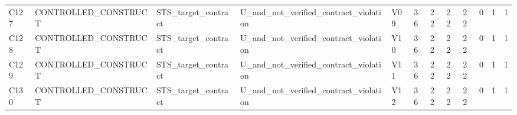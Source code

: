 \begin{longtable}{llllllllllll}
C127 & CONTROLLED\_CONSTRUCT & STS\_target\_contract & U\_and\_not\_verified\_contract\_violation & V09 & 36 & 22 & 22 & 22 & 0 & 1 & 1 \\
C128 & CONTROLLED\_CONSTRUCT & STS\_target\_contract & U\_and\_not\_verified\_contract\_violation & V10 & 36 & 22 & 22 & 22 & 0 & 1 & 1 \\
C129 & CONTROLLED\_CONSTRUCT & STS\_target\_contract & U\_and\_not\_verified\_contract\_violation & V11 & 36 & 22 & 22 & 22 & 0 & 1 & 1 \\
C130 & CONTROLLED\_CONSTRUCT & STS\_target\_contract & U\_and\_not\_verified\_contract\_violation & V12 & 36 & 22 & 22 & 22 & 0 & 1 & 1 \\
\hline\end{longtable}
